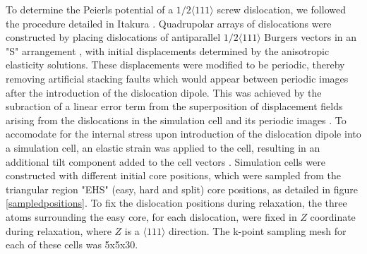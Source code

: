 \documentclass[a4paper,11pt]{article}
\begin{document}
To determine the Peierls potential of a \(1/2\langle 111 \rangle\) screw dislocation, we followed the procedure
detailed in Itakura \cite{Itakura2012}. Quadrupolar arrays of dislocations were constructed by
placing dislocations of antiparallel \(1/2\langle 111\rangle\) Burgers vectors in an "S" arrangement
\cite{Clouet2012}, with initial displacements determined by the
anisotropic elasticity solutions. These displacements were modified to be periodic, thereby
removing artificial stacking faults which would appear between periodic images after the
introduction of the dislocation dipole. This was achieved by the subraction of a linear error
term from the superposition of displacement fields arising from the dislocations in the
simulation cell and its periodic images \cite{vasilybulatov2006}. To accomodate for the internal
stress upon introduction of the dislocation dipole into a simulation cell, an elastic strain was
applied to the cell, resulting in an additional tilt component added to the cell vectors
\cite{Clouet2012,vasilybulatov2006}. Simulation cells were constructed with different initial core
positions, which were sampled from the triangular region "EHS" (easy, hard and split) core
positions, as detailed in figure \ref{sampledpositions}. To fix the dislocation positions during
relaxation, the three atoms surrounding the easy core, for each dislocation, were fixed in \(Z\)
coordinate during relaxation, where \(Z\) is a \(\langle 111 \rangle\) direction. The k-point sampling mesh for
each of these cells was 5x5x30.
\end{document}
